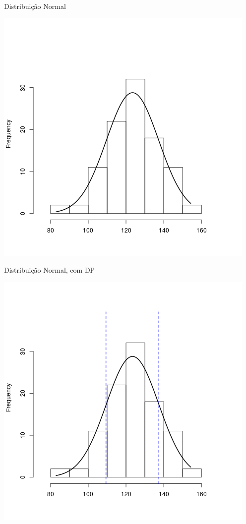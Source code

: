 \documentclass{beamer}
\begin{document}
\begin{frame}{\scriptsize Distribuição Normal}
  \begin{center}
    \includegraphics[height=\textheight]{Cap4/normal2}
  \end{center}
\end{frame}

\begin{frame}{\scriptsize Distribuição Normal, com DP}
  \begin{center}
    \includegraphics[height=\textheight]{Cap4/normal4}
  \end{center}
\end{frame}
\end{document}
